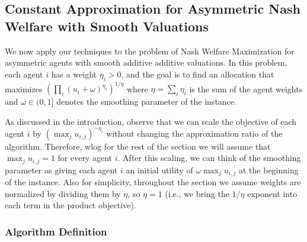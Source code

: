 



\subsection{Constant Approximation for Asymmetric Nash Welfare with Smooth Valuations}
\label{subsec:smooth-anw}
We now apply our techniques to the problem of Nash Welfare Maximization for asymmetric agents with smooth additive additive valuations.
In this problem, each agent $i$ has a weight $\eta_i > 0$, and the goal is to find an allocation that maximizes $ \left(\prod_i (u_i + \omega)^{\eta_i}\right)^{1/\eta}$
where $\eta = \sum_i \eta_i$ is the sum of the agent weights and $\omega \in (0,1]$ denotes the smoothing parameter of the instance.

As discussed in the introduction, observe that we can scale the objective of each 
agent $i$ by $(\max_j u_{i,j})^{-\eta_i}$ without changing the approximation ratio of the algorithm. 
Therefore, wlog for the rest of the section we will assume that $\max_{j}u_{i,j} = 1$ for every agent $i$.
After this scaling, we can think of the smoothing parameter as giving each agent $i$ an initial utility of $\omega \max_{j}u_{i,j}$
at the beginning of the instance. Also for simplicity, throughout the section we assume weights are normalized by dividing them by $\eta$, so $\eta = 1$ (i.e., we bring the $1/\eta$ exponent into each term in the product objective).  





\subsubsection{Algorithm Definition}

